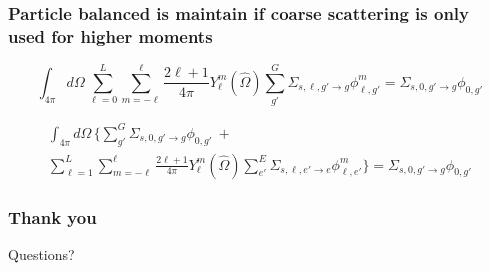 \documentclass[xcolor=dvipsnames]{beamer}
\begin{document}
\begin{frame}
  \frametitle{Particle balanced is maintain if coarse scattering is only used for higher moments}

\begin{equation*}
\int_{4\pi} d\Omega \, \sum_{\ell = 0}^L \sum_{m = -\ell}^{\ell} \frac{2\ell + 1}{4\pi} Y_\ell^m(\hat{\Omega}) \sum_{g'}^G \Sigma_{s,\ell,g' \to g} \phi_{\ell,g'}^m = \Sigma_{s,0,g' \to g} \phi_{0,g'}
\end{equation*}

\begin{multline*}
\int_{4\pi} d\Omega \, \Big\{ \sum_{g'}^G \Sigma_{s,0,g' \to g} \phi_{0,g'} \: + \\ \sum_{\ell = 1}^L \sum_{m = -\ell}^{\ell} \frac{2\ell + 1}{4\pi} Y_\ell^m(\hat{\Omega}) \sum_{e'}^E \Sigma_{s,\ell,e' \to e} \phi_{\ell,e'}^m \Big\} = \Sigma_{s,0,g' \to g} \phi_{0,g'}
\end{multline*}

\end{frame}





\begin{frame}[noframenumbering]
\frametitle{Thank you}
Questions?
\end{frame}
\end{document}
